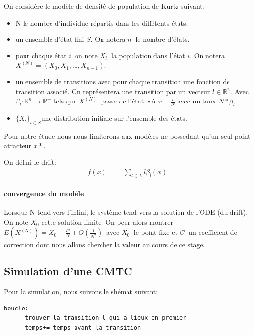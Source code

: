 \documentclass[a4paper]{article}
\begin{document}
On considère le modèle de densité de population de Kurtz suivant:

\begin{itemize}
\item N le nombre d'individue répartis dans les diffétents états.
\item un ensemble d'état fini $S$. On notera $n \ $ le
  nombre d'états.
\item pour chaque état $i \ $ on note $X_i \ $ la population dans
  l'état $i$. On notera $X^{(N)}=(X_0,X_1,...,X_{n-1})$.
\item un ensemble de transitions avec pour chaque transition une
  fonction de transition associé. On représentera une transition par
  un vecteur  $l \in \mathbb{R}^{n}$. Avec $\beta_l : \mathbb{R}^n
  \rightarrow \mathbb{R}^+$ tels que $X^{(N)} \ $ passe de l'état $x$ à
  $x+\frac{l}{N}$ avec un taux $N*\beta_l$.
\item $ \{ X_i \}_{i \in S}$une distribution initiale sur l'ensemble des états.
\end{itemize}

Pour notre étude nous nous limiterons aux modèles ne possedant qu'un
seul point atracteur $x*$.

On défini le drift:
\begin{eqnarray*}
  f(x) &=& \sum_{l \in L}l\beta_l(x)
\end{eqnarray*}

\paragraph{convergence du modèle}
Lorsque N tend vers l'infini, le système tend vers la solution de
l'ODE (du drift). On note $X_0$ cette solution limite.
On peur alors montrer $E(X^{(N)})=X_0+\frac{C}{N}+O(\frac{1}{N^2}) \ $
avec $X_0 \ $ le point fixe et $C \ $ un coefficient de correction
dont nous allons chercher la valeur au cours de ce stage.

\subsection{Simulation d'une CMTC}

Pour la simulation, nous suivons le shémat suivant:

\begin{lstlisting}[frame=single]
  boucle:
      trouver la transition l qui a lieux en premier
      temps+= temps avant la transition
\end{lstlisting}
\end{document}
